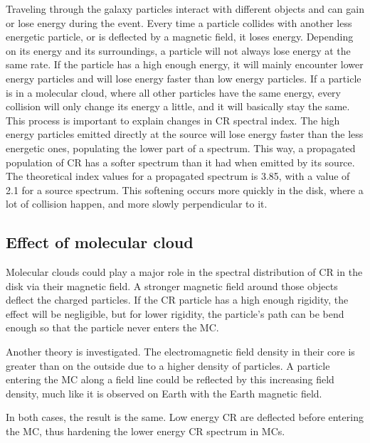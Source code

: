 Traveling through the galaxy particles interact with different objects and can gain or lose energy during the event. Every time a particle collides with another less energetic particle, or is deflected by a magnetic field, it loses energy. Depending on its energy and its surroundings, a particle will not always lose energy at the same rate.
If the particle has a high enough energy, it will mainly encounter lower energy particles and will lose energy faster than low energy particles. If a particle is in a molecular cloud, where all other particles have the same energy, every collision will only change its energy a little, and it will basically stay the same.
This process is important to explain changes in CR spectral index. The high energy particles emitted directly at the source will lose energy faster than the less energetic ones, populating the lower part of a spectrum. This way, a propagated population of CR has a softer spectrum than it had when emitted by its source. The theoretical index values for a propagated spectrum is 3.85, with a value of 2.1 for a source spectrum. \cite{Hillas2005}
This softening occurs more quickly in the disk, where a lot of collision happen, and more slowly perpendicular to it.



\subsection{Effect of molecular cloud}

Molecular clouds could play a major role in the spectral distribution of CR in the disk via their magnetic field. 
A stronger magnetic field around those objects deflect the charged particles. If the CR particle has a high enough rigidity, the effect will be negligible, but for lower rigidity, the particle's path can be bend enough so that the particle never enters the MC.

Another theory is investigated. The electromagnetic field density in their core is greater than on the outside due to a higher density of particles. A particle entering the MC along a field line could be reflected by this increasing field density, much like it is observed on Earth with the Earth magnetic field.


In both cases, the result is the same. Low energy CR are deflected before entering the MC, thus hardening the lower energy CR spectrum in MCs.





